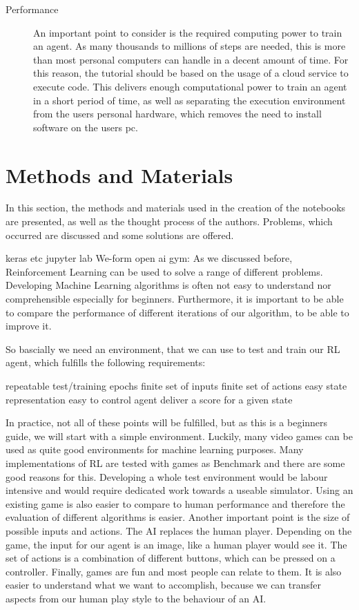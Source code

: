 \documentclass[a4paper]{article}
\begin{document}
\begin{description}
			\item[Performance] An important point to consider is the required computing power to train an agent. As many thousands to millions of steps are needed, this is more than most personal computers can handle in a decent amount of time.  
			For this reason, the tutorial should be based on the usage of a cloud service to execute code. 
			This delivers enough computational power to train an agent in a short period of time, as well as separating the execution environment from the users personal hardware, which removes the need to install software on the users pc.
		\end{description}

	\section{Methods and Materials}
		In this section, the methods and materials used in the creation of the notebooks are presented, as well as the thought process of the authors. Problems, which occurred are discussed and some solutions are offered.
		
		
	keras etc
	jupyter lab
	We-form
	open ai gym: 
		As we discussed before, Reinforcement Learning can be used to solve a range of different problems. Developing Machine Learning algorithms is often not easy to understand nor comprehensible especially for beginners. Furthermore, it is important to be able to compare the performance of different iterations of our algorithm, to be able to improve it.
		
		So bascially we need an environment, that we can use to test and train our RL agent, which fulfills the following requirements:
		
		repeatable test/training epochs
		finite set of inputs
		finite set of actions
		easy state representation
		easy to control agent
		deliver a score for a given state
		
		In practice, not all of these points will be fulfilled, but as this is a beginners guide, we will start with a simple environment. Luckily, many video games can be used as quite good environments for machine learning purposes. Many implementations of RL are tested with games as Benchmark and there are some good reasons for this. Developing a whole test environment would be labour intensive and would require dedicated work towards a useable simulator. Using an existing game is also easier to compare to human performance and therefore the evaluation of different algorithms is easier. Another important point is the size of possible inputs and actions. The AI replaces the human player. Depending on the game, the input for our agent is an image, like a human player would see it. The set of actions is a combination of different buttons, which can be pressed on a controller. Finally, games are fun and most people can relate to them. It is also easier to understand what we want to accomplish, because we can transfer aspects from our human play style to the behaviour of an AI. 
\end{document}
